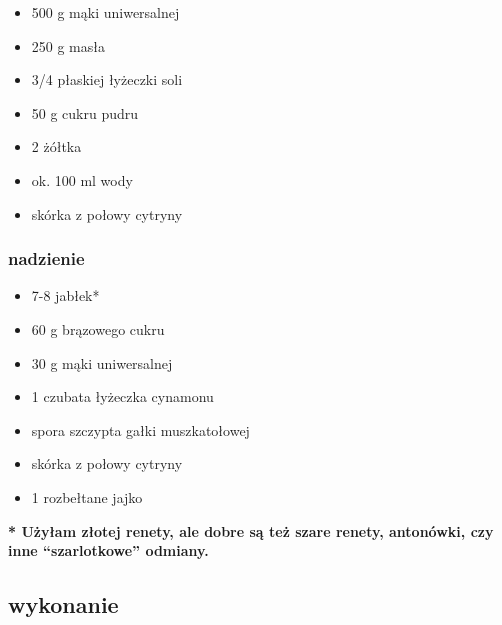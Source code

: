 \documentclass[16pt, letterpaper, titlepage]{article}
\begin{document}
\begin{itemize}
\item 500 g mąki uniwersalnej
\item 250 g masła
\item 3/4 płaskiej łyżeczki soli
\item 50 g cukru pudru
\item 2 żółtka
\item ok. 100 ml wody
\item skórka z połowy cytryny
\end{itemize}
\begin{center}
\subsubsection*{nadzienie}
\end{center}
\begin{itemize}
\item 7-8 jabłek*
\item 60 g brązowego cukru
\item 30 g mąki uniwersalnej
\item 1 czubata łyżeczka cynamonu
\item spora szczypta gałki muszkatołowej
\item skórka z połowy cytryny
\item 1 rozbełtane jajko
\end{itemize}
\textbf{* Użyłam złotej renety, ale dobre są też szare renety, antonówki, czy inne “szarlotkowe” odmiany.}
\begin{center}
\begin{Large}
\subsection*{wykonanie}
\end{Large}
\end{center}
\end{document}
